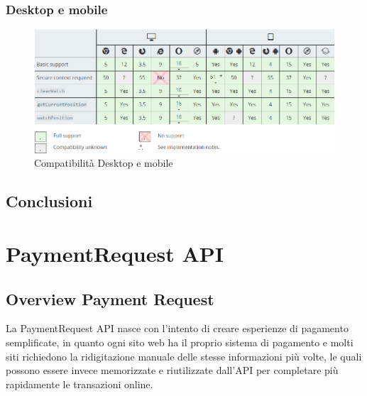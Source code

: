 \documentclass[11pt ,a4paper , twoside , openright ]{article}
\begin{document}
\subsubsection{Desktop e mobile}
\begin{figure}[h]
	\centering
	\includegraphics[width=1\linewidth]{compatibility}
	\caption{Compatibilità Desktop e mobile}
	\label{fig: Compatibilità Desktop e mobile}
\end{figure}
\subsection{Conclusioni}

\newpage
\section{PaymentRequest API}

\subsection{Overview Payment Request}
La PaymentRequest API \cite{rif9} nasce con l'intento di creare esperienze di pagamento semplificate, in quanto ogni sito web ha il proprio sistema di pagamento e molti siti richiedono la ridigitazione manuale delle stesse informazioni più volte, le quali possono essere invece memorizzate e riutilizzate dall'API per completare più rapidamente le transazioni online.
\end{document}
